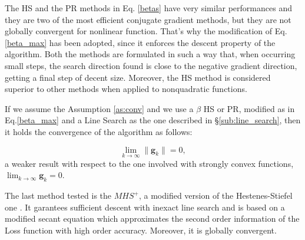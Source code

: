 			The HS and the PR methods in Eq. \ref{betas} have very similar performances and they are two of the most efficient conjugate gradient methods, but they are not globally convergent for nonlinear function\cite{Griffiths-1984}. That's why the modification of Eq. \ref{beta_max} has been adopted\cite{Powell-1986}, since it enforces the descent property of the algorithm.
			Both the methods are formulated in such a way that, when occurring small steps, the search direction found is close to the negative gradient direction, getting a final step of decent size\cite{Gilbert-1992}.
			Moreover, the HS method is considered superior to other methods when applied to nonquadratic functions.

			If we assume the Assumption \ref{as:conv} and we use a $\beta$ HS or PR, modified as in Eq.\ref{beta_max} and a Line Search as the one described in \S\ref{sub:line_search}, then it holds the convergence of the algorithm as follows\cite{Gilbert-1992}:

			\begin{equation}
			\label{conv_cg}
			  \lim_{k \to \infty} \|\textbf{g}_k\| = 0,
			\end{equation}
			a weaker result with respect to the one involved with strongly convex functions, $\lim_{k \to \infty} \textbf{g}_k = 0.$



			The last method tested is the $MHS^+$, a modified version of the Hestenes-Stiefel one \cite{LIVIERIS2013491}.
			It garantees sufficient descent with inexact line search and is based on a modified secant equation which approximates the second order information of the Loss function with high order accuracy. Moreover, it is globally convergent.

